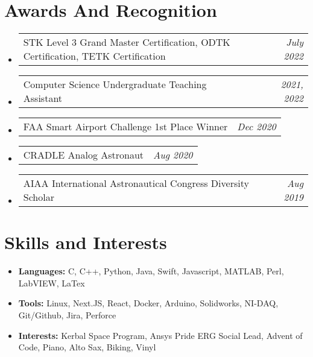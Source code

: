 \documentclass[letterpaper,11pt]{article}
\makeatletter
\newenvironment{outeritemize}
{\begin{itemize}[label={},leftmargin=*]}
	{\end{itemize}}
\newcommand{\skillsItem}[1]{
	\item\small{
		\textrm{#1 \vspace{-5pt}}
	}
}
\newcommand{\resumeAward}[2]{
    \item
    \begin{tabular*}{0.97\textwidth}{l@{\extracolsep{\fill}}r}
      \textrm{\small #1} & \textit{\small #2} \\
    \end{tabular*}\vspace{-9pt}
}
\newcommand{\resumeBullet}[1]{
    \item
    \begin{tabular*}{0.97\textwidth}{l@{\extracolsep{\fill}}r}
      \textrm{\small #1}
    \end{tabular*}\vspace{-7pt}
}
\newcommand{\resumeSubHeadingListStart}{\begin{outeritemize}}%
\newcommand{\resumeSubHeadingListEnd}{\end{outeritemize}}
\makeatother
\begin{document}
\section{Awards And Recognition}
  \resumeSubHeadingListStart  
    \resumeAward{STK Level 3 Grand Master Certification, ODTK Certification, TETK  Certification}{July 2022}
  	\resumeAward{Computer Science Undergraduate Teaching Assistant} {2021, 2022}	
    \resumeAward{FAA Smart Airport Challenge 1st Place Winner}{Dec 2020}
    \resumeAward{CRADLE Analog Astronaut}{Aug 2020}
    \resumeAward{AIAA International Astronautical Congress Diversity Scholar}
      {Aug 2019}
  \resumeSubHeadingListEnd
  
    \vspace{2pt}
  \section{Skills and Interests}
  \resumeSubHeadingListStart
  \skillsItem{
  	\textbf{Languages: }{C, C++, Python, Java, Swift, Javascript, MATLAB, Perl, LabVIEW, LaTex}
  }
  \skillsItem{
  	\textbf{Tools: }{Linux, Next.JS, React, Docker, Arduino, Solidworks, NI-DAQ, Git/Github, Jira, Perforce}
  }
  \skillsItem{
  	\textbf{Interests: }{Kerbal Space Program, Ansys Pride ERG Social Lead, Advent of Code, Piano, Alto Sax, Biking, Vinyl}
  }
  \resumeSubHeadingListEnd
  


    

\end{document}
